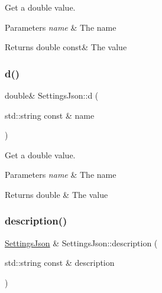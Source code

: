 Get a double value. 


\begin{DoxyParams}{Parameters}
{\em name} & The name \\
\hline
\end{DoxyParams}
\begin{DoxyReturn}{Returns}
double const\& The value 
\end{DoxyReturn}
\mbox{\label{class_settings_json_a29dcf05e16ab9ecb60c48e7a7e0b4fe5}} 
\subsubsection{\texorpdfstring{d()}{d()}\hspace{0.1cm}{\footnotesize\ttfamily [2/2]}}
{\footnotesize\ttfamily double\& Settings\+Json\+::d (\begin{DoxyParamCaption}\item[{std\+::string const \&}]{name }\end{DoxyParamCaption})\hspace{0.3cm}{\ttfamily [inline]}}



Get a double value. 


\begin{DoxyParams}{Parameters}
{\em name} & The name \\
\hline
\end{DoxyParams}
\begin{DoxyReturn}{Returns}
double \& The value 
\end{DoxyReturn}
\mbox{\label{class_settings_json_aed042d48b268ef368bd1b6b0a9e013fd}} 
\subsubsection{\texorpdfstring{description()}{description()}}
{\footnotesize\ttfamily \hyperlink{class_settings_json}{Settings\+Json} \& Settings\+Json\+::description (\begin{DoxyParamCaption}\item[{std\+::string const \&}]{description }\end{DoxyParamCaption})}



